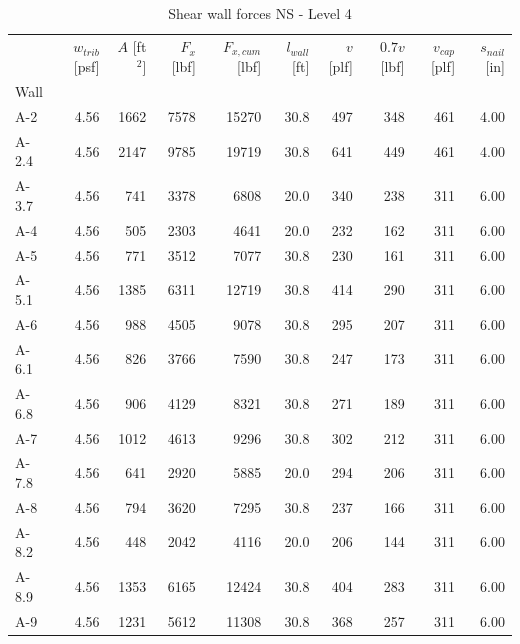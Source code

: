 \documentclass[11pt]{article}
\begin{document}
    
    \begin{table}[H]
\centering
\caption{Shear wall forces NS - Level 4}
\label{tab:shear_wall_forces_level4_ns}
\begin{tabular}{lrrrrrrrrr}
\toprule
 & $w_{trib}$ [psf] & $A$ [ft$^2$] & $F_x$ [lbf] & $F_{x,cum}$ [lbf] & $l_{wall}$ [ft] & $v$ [plf] & $0.7 v$ [lbf] & $v_{cap}$ [plf] & $s_{nail}$ [in] \\
Wall &  &  &  &  &  &  &  &  &  \\
\midrule
A-2 & 4.56 & 1662 & 7578 & 15270 & 30.8 & 497 & 348 & 461 & 4.00 \\
A-2.4 & 4.56 & 2147 & 9785 & 19719 & 30.8 & 641 & 449 & 461 & 4.00 \\
A-3.7 & 4.56 & 741 & 3378 & 6808 & 20.0 & 340 & 238 & 311 & 6.00 \\
A-4 & 4.56 & 505 & 2303 & 4641 & 20.0 & 232 & 162 & 311 & 6.00 \\
A-5 & 4.56 & 771 & 3512 & 7077 & 30.8 & 230 & 161 & 311 & 6.00 \\
A-5.1 & 4.56 & 1385 & 6311 & 12719 & 30.8 & 414 & 290 & 311 & 6.00 \\
A-6 & 4.56 & 988 & 4505 & 9078 & 30.8 & 295 & 207 & 311 & 6.00 \\
A-6.1 & 4.56 & 826 & 3766 & 7590 & 30.8 & 247 & 173 & 311 & 6.00 \\
A-6.8 & 4.56 & 906 & 4129 & 8321 & 30.8 & 271 & 189 & 311 & 6.00 \\
A-7 & 4.56 & 1012 & 4613 & 9296 & 30.8 & 302 & 212 & 311 & 6.00 \\
A-7.8 & 4.56 & 641 & 2920 & 5885 & 20.0 & 294 & 206 & 311 & 6.00 \\
A-8 & 4.56 & 794 & 3620 & 7295 & 30.8 & 237 & 166 & 311 & 6.00 \\
A-8.2 & 4.56 & 448 & 2042 & 4116 & 20.0 & 206 & 144 & 311 & 6.00 \\
A-8.9 & 4.56 & 1353 & 6165 & 12424 & 30.8 & 404 & 283 & 311 & 6.00 \\
A-9 & 4.56 & 1231 & 5612 & 11308 & 30.8 & 368 & 257 & 311 & 6.00 \\
\bottomrule
\end{tabular}
\end{table}
\end{document}
